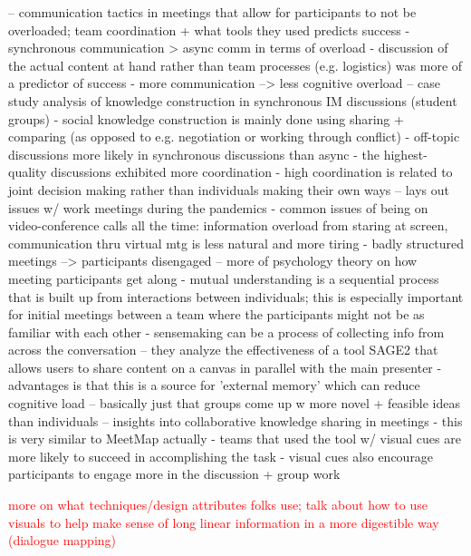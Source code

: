 \cite{fussellCoordinationOverloadTeam1998} -- communication tactics in meetings that allow for participants to not be overloaded; team coordination + what tools they used predicts success
    - synchronous communication > async comm in terms of overload
    - discussion of the actual content at hand rather than team processes (e.g. logistics) was more of a predictor of success
    - more communication --> less cognitive overload 
\cite{hou2011analyzing} -- case study analysis of knowledge construction in synchronous IM discussions (student groups)
    - social knowledge construction is mainly done using sharing + comparing (as opposed to e.g. negotiation or working through conflict)
    - off-topic discussions more likely in synchronous discussions than async
    - the highest-quality discussions exhibited more coordination
    - high coordination is related to joint decision making rather than individuals making their own ways
\cite{karl2021virtual} -- lays out issues w/ work meetings during the pandemics
    - common issues of being on video-conference calls all the time: information overload from staring at screen, communication thru virtual mtg is less natural and more tiring
    - badly structured meetings --> participants disengaged 
\cite{kecskesActivatingSeekingCreating2009} -- more of psychology theory on how meeting participants get along
    - mutual understanding is a sequential process that is built up from interactions between individuals; this is especially important for initial meetings between a team where the participants might not be as familiar with each other 
    - sensemaking can be a process of collecting info from across the conversation 
\cite{kirshenbaum2021traces} -- they analyze the effectiveness of a tool SAGE2 that allows users to share content on a canvas in parallel with the main presenter
    - advantages is that this is a source for 'external memory' which can reduce cognitive load
\cite{kohnBuildingIdeasOthers2011} -- basically just that groups come up w more novel + feasible ideas than individuals
\cite{yuExploringHowWorkspace2022} -- insights into collaborative knowledge sharing in meetings
    - this is very similar to MeetMap actually
    - teams that used the tool w/ visual cues are more likely to succeed in accomplishing the task
    - visual cues also encourage participants to engage more in the discussion + group work

\textcolor{red}{more on what techniques/design attributes folks use; talk about how to use visuals to help make sense of long linear information in a more digestible way (dialogue mapping)}

